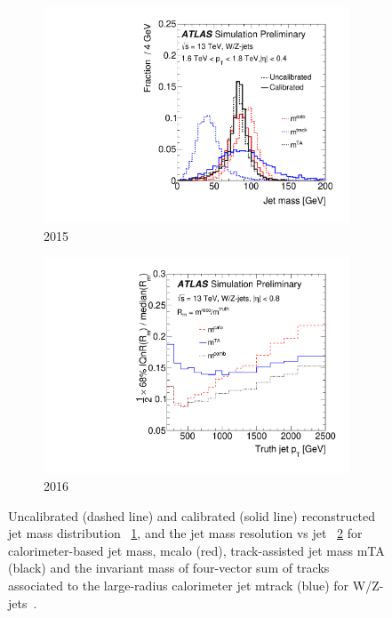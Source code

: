 \begin{figure}[h!]
  \centering
  \captionsetup{justification=centering}
	\hspace{-2cm}
    \begin{subfigure}[b]{0.35\textwidth}
        \includegraphics[width=\textwidth,angle=-90]{figures/object/Jet_mass}
        \caption{2015}
        \label{fig:Jet_mass_dist}
    \end{subfigure}
    \quad
    \quad
    \quad
    \quad
    \begin{subfigure}[b]{0.35\textwidth}
        \includegraphics[width=\textwidth,angle=-90]{figures/object/Jet_mass_resolution}
        \caption{2016}
        \label{fig:Jet_mass_resolution}
    \end{subfigure}
   \caption{Uncalibrated (dashed line) and calibrated (solid line) reconstructed jet mass distribution ~\ref{fig:Jet_mass_dist}, and the jet mass resolution vs jet \pt ~\ref{fig:Jet_mass_resolution} for calorimeter-based jet mass, mcalo (red), track-assisted jet mass mTA (black) and the invariant mass of four-vector sum of tracks associated to the large-radius calorimeter jet mtrack (blue) for W/Z-jets~\cite{ATLAS-CONF-2016-035}.}
  \label{fig:Jet_mass}
\end{figure}

